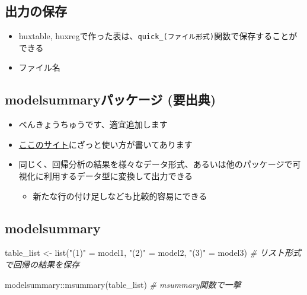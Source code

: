 \documentclass[
]{ltjsarticle}
\newenvironment{Shaded}{\begin{snugshade}}{\end{snugshade}}
\newcommand{\CommentTok}[1]{\textcolor[rgb]{0.56,0.35,0.01}{\textit{#1}}}
\newcommand{\FunctionTok}[1]{\textcolor[rgb]{0.00,0.00,0.00}{#1}}
\newcommand{\NormalTok}[1]{#1}
\newcommand{\OtherTok}[1]{\textcolor[rgb]{0.56,0.35,0.01}{#1}}
\newcommand{\SpecialCharTok}[1]{\textcolor[rgb]{0.00,0.00,0.00}{#1}}
\newcommand{\StringTok}[1]{\textcolor[rgb]{0.31,0.60,0.02}{#1}}
\providecommand{\tightlist}{%
  \setlength{\itemsep}{0pt}\setlength{\parskip}{0pt}}
\begin{document}
\hypertarget{ux51faux529bux306eux4fddux5b58}{%
\subsection{出力の保存}\label{ux51faux529bux306eux4fddux5b58}}

\begin{itemize}
\tightlist
\item
  huxtable,
  huxregで作った表は、\texttt{quick\_(ファイル形式)}関数で保存することができる
\item
  ファイル名
\end{itemize}

\hypertarget{modelsummaryux30d1ux30c3ux30b1ux30fcux30b8-ux8981ux51faux5178}{%
\subsection{modelsummaryパッケージ
(要出典)}\label{modelsummaryux30d1ux30c3ux30b1ux30fcux30b8-ux8981ux51faux5178}}

\begin{itemize}
\tightlist
\item
  べんきょうちゅうです、適宜追加します
\item
  \href{https://keita43a.hatenablog.com/entry/2020/05/29/210250}{ここのサイト}にざっと使い方が書いてあります
\item
  同じく、回帰分析の結果を様々なデータ形式、あるいは他のパッケージで可視化に利用するデータ型に変換して出力できる

  \begin{itemize}
  \tightlist
  \item
    新たな行の付け足しなども比較的容易にできる
  \end{itemize}
\end{itemize}

\hypertarget{modelsummary}{%
\subsection{modelsummary}\label{modelsummary}}

\begin{Shaded}
\begin{Highlighting}[]
\NormalTok{table\_list }\OtherTok{\textless{}{-}} \FunctionTok{list}\NormalTok{(}\StringTok{"(1)"} \OtherTok{=}\NormalTok{ model1, }\StringTok{"(2)"} \OtherTok{=}\NormalTok{ model2, }\StringTok{"(3)"} \OtherTok{=}\NormalTok{ model3) }\CommentTok{\# リスト形式で回帰の結果を保存}

\NormalTok{modelsummary}\SpecialCharTok{::}\FunctionTok{msummary}\NormalTok{(table\_list) }\CommentTok{\# msummary関数で一撃}
\end{Highlighting}
\end{Shaded}
\end{document}
